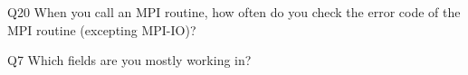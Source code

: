 \begin{description}%
\item{Q20} When you call an MPI routine, how often do you check the error code of the MPI routine  (excepting MPI-IO)?%
\item{Q7} Which fields are you mostly working in?%
\end{description}%
